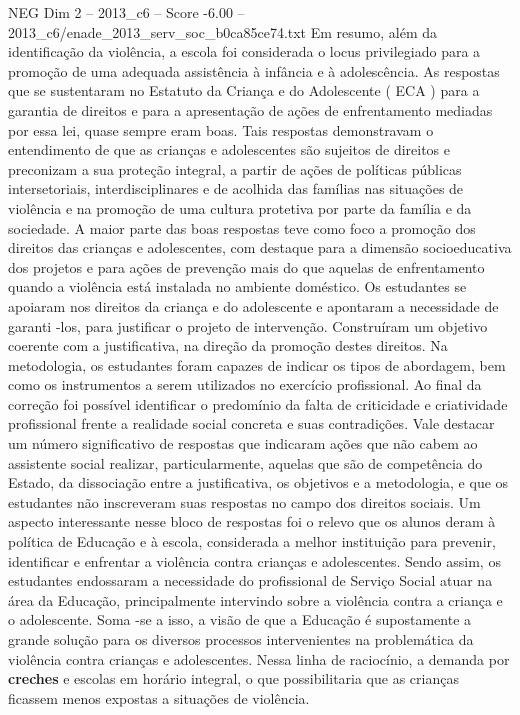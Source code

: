 \begin{textsample}{NEG Dim 2 – 2013\_c6 – Score -6.00 – 2013\_c6/enade\_2013\_serv\_soc\_b0ca85ce74.txt}
Em resumo, além da identificação da violência, a escola foi considerada o locus privilegiado para a promoção de uma adequada assistência à infância e à adolescência.
As respostas que se sustentaram no Estatuto da Criança e do Adolescente ( ECA ) para a garantia de direitos e para a apresentação de ações de enfrentamento mediadas por essa lei, quase sempre eram boas.
Tais respostas demonstravam o entendimento de que as crianças e adolescentes são sujeitos de direitos e preconizam a sua proteção integral, a partir de ações de políticas públicas intersetoriais, interdisciplinares e de acolhida das famílias nas situações de violência e na promoção de uma cultura protetiva por parte da família e da sociedade.
A maior parte das boas respostas teve como foco a promoção dos direitos das crianças e adolescentes, com destaque para a dimensão socioeducativa dos projetos e para ações de prevenção mais do que aquelas de enfrentamento quando a violência está instalada no ambiente doméstico.
Os estudantes se apoiaram nos direitos da criança e do adolescente e apontaram a necessidade de garanti -los, para justificar o projeto de intervenção.
Construíram um objetivo coerente com a justificativa, na direção da promoção destes direitos.
Na metodologia, os estudantes foram capazes de indicar os tipos de abordagem, bem como os instrumentos a serem utilizados no exercício profissional.
Ao final da correção foi possível identificar o predomínio da falta de criticidade e criatividade profissional frente a realidade social concreta e suas contradições.
Vale destacar um número significativo de respostas que indicaram ações que não cabem ao assistente social realizar, particularmente, aquelas que são de competência do Estado, da dissociação entre a justificativa, os objetivos e a metodologia, e que os estudantes não inscreveram suas respostas no campo dos direitos sociais.
Um aspecto interessante nesse bloco de respostas foi o relevo que os alunos deram à política de Educação e à escola, considerada a melhor instituição para prevenir, identificar e enfrentar a violência contra crianças e adolescentes.
Sendo assim, os estudantes endossaram a necessidade do profissional de Serviço Social atuar na área da Educação, principalmente intervindo sobre a violência contra a criança e o adolescente.
Soma -se a isso, a visão de que a Educação é supostamente a grande solução para os diversos processos intervenientes na problemática da violência contra crianças e adolescentes.
Nessa linha de raciocínio, a demanda por \textbf{creches} e escolas em horário integral, o que possibilitaria que as crianças ficassem menos expostas a situações de violência.

\end{textsample}
